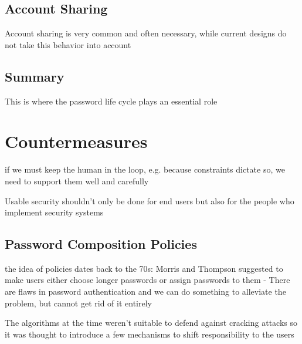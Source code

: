 	\cite{Bonneau2015SecretsLies}
	


	\subsection{Account Sharing}
	Account sharing is very common and often necessary, while current designs do not take this behavior into account \cite{Singh2007PasswordSharing}

	\subsection{Summary}
	This is where the password life cycle plays an essential role \cite{Stobert2014PasswordLifeCycle}

\section{Countermeasures}

if we must keep the human in the loop, e.g. because constraints dictate so, we need to support them well and carefully \cite{Cranor2008FrameworkReasoning}

Usable security shouldn't only be done for end users but also for the people who implement security systems \cite{Acar2016NotYourDeveloper}


	\subsection{Password Composition Policies}\label{sec:rw:policies}
	
	
	
	
	the idea of policies dates back to the 70s: Morris and Thompson suggested to make users
	either choose longer passwords or assign passwords to them - There are flaws in password authentication and we can do something to alleviate the problem, but cannot get rid of it entirely \cite{Morris1979PasswordSecurity}
	
	The algorithms at the time weren't suitable to defend against cracking attacks so it was thought to introduce a few mechanisms to shift responsibility to the users \cite{Feldmeier1990UnixPasswordSecurity}
	



